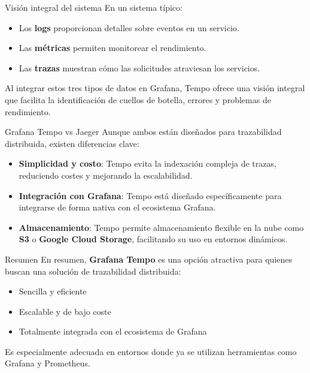 \documentclass{beamer}
\begin{document}
\begin{frame}{Visión integral del sistema}
En un sistema típico:
\begin{itemize}
  \item Los \textbf{logs} proporcionan detalles sobre eventos en un servicio.
  \item Las \textbf{métricas} permiten monitorear el rendimiento.
  \item Las \textbf{trazas} muestran cómo las solicitudes atraviesan los servicios.
\end{itemize}

Al integrar estos tres tipos de datos en Grafana, Tempo ofrece una visión integral que facilita la identificación de cuellos de botella, errores y problemas de rendimiento.
\end{frame}

\begin{frame}{Grafana Tempo vs Jaeger}
Aunque ambos están diseñados para trazabilidad distribuida, existen diferencias clave:
\begin{itemize}
  \item \textbf{Simplicidad y costo}: Tempo evita la indexación compleja de trazas, reduciendo costes y mejorando la escalabilidad.
  \item \textbf{Integración con Grafana}: Tempo está diseñado específicamente para integrarse de forma nativa con el ecosistema Grafana.
  \item \textbf{Almacenamiento}: Tempo permite almacenamiento flexible en la nube como \textbf{S3} o \textbf{Google Cloud Storage}, facilitando su uso en entornos dinámicos.
\end{itemize}
\end{frame}

\begin{frame}{Resumen}
En resumen, \textbf{Grafana Tempo} es una opción atractiva para quienes buscan una solución de trazabilidad distribuida:
\begin{itemize}
  \item Sencilla y eficiente
  \item Escalable y de bajo coste
  \item Totalmente integrada con el ecosistema de Grafana
\end{itemize}

Es especialmente adecuada en entornos donde ya se utilizan herramientas como Grafana y Prometheus.
\end{frame}

\end{document}
